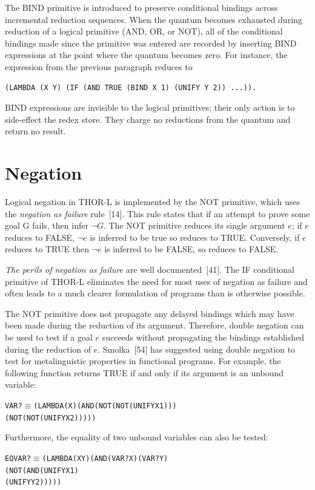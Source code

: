 The BIND primitive is introduced to preserve conditional bindings across
incremental reduction sequences. When the quantum becomes exhausted during
reduction of a logical primitive (AND, OR, or NOT), all of the conditional
bindings made since the primitive was entered are recorded by inserting BIND
expressions at the point where the quantum becomes zero. For instance, the
expression from the previous paragraph reduces to
\begin{verbatim}
(LAMBDA (X Y) (IF (AND TRUE (BIND X 1) (UNIFY Y 2)) ...)).
\end{verbatim}
BIND expressions are invisible to the logical primitives; their only action is
to side-effect the redex store. They charge no reductions from the quantum and
return no result.

\section{Negation}

Logical negation in THOR-L is implemented by the NOT primitive, which uses the
\emph{negation as failure} rule~[14]. This rule states that if an attempt to prove some
goal G fails, then infer \(\neg G\). The NOT primitive reduces its single
argument \(e\); if \(e\) reduces to FALSE, \(\neg e\) is inferred to be true so
 reduces to TRUE. Conversely, if \(e\) reduces to TRUE then
\(\neg e\) is inferred to be FALSE, so  reduces to FALSE.

\emph{The perils of negation as failure} are well documented~[41]. The IF conditional
primitive of THOR-L eliminates the need for most uses of negation as failure and
often leads to a much clearer formulation of programs than is otherwise
possible.

The NOT primitive does not propagate any delayed bindings which may have been
made during the reduction of its argument. Therefore, double negation can be
used to test if a goal \(e\) succeeds without propagating the bindings
established during the reduction of \(e\). Smolka~[54] has suggested using
double negation to test for metalinguistic properties in functional programs.
For example, the following function returns TRUE if and only if its argument is
an unbound variable:
\begin{alltt}
VAR? \(\equiv\) (LAMBDA (X) (AND (NOT (NOT (UNIFY X 1)))
                       (NOT (NOT (UNIFY X 2)))))
\end{alltt}
Furthermore, the equality of two unbound variables can also be tested:
\begin{alltt}
EQVAR? \(\equiv\) (LAMBDA (X Y) (AND (VAR? X) (VAR? Y)
                            (NOT (AND (UNIFY X 1)
                                      (UNIFY Y 2)))))
\end{alltt}

